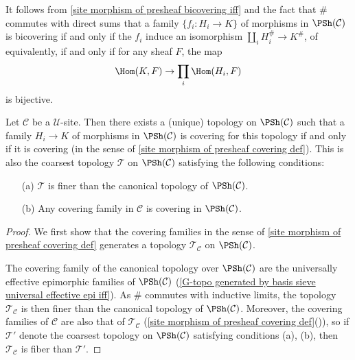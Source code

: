 \begin{remark}
It follows from \cref{site morphism of presheaf bicovering iff} and the fact that $\#$ commutes with direct sums that a family $\{f_i:H_i\to K\}$ of morphisms in $\PSh(\mathcal{C})$ is bicovering if and only if the $f_i$ induce an isomorphism $\coprod_iH_i^\#\to K^\#$, of equivalently, if and only if for any sheaf $F$, the map
\[\Hom(K,F)\to \prod_i\Hom(H_i,F)\]
is bijective.
\end{remark}
\begin{proposition}\label{site induced topology on PSh char}
Let $\mathcal{C}$ be a $\mathscr{U}$-site. Then there exists a (unique) topology on $\PSh(\mathcal{C})$ such that a family $H_i\to K$ of morphisms in $\PSh(\mathcal{C})$ is covering for this topology if and only if it is covering (in the sense of \cref{site morphism of presheaf covering def}). This is also the coarsest topology $\mathcal{T}$ on $\PSh(\mathcal{C})$ satisfying the following conditions:
\begin{enumerate}
\item[(a)] $\mathcal{T}$ is finer than the canonical topology of $\PSh(\mathcal{C})$.
\item[(b)] Any covering family in $\mathcal{C}$ is covering in $\PSh(\mathcal{C})$.
\end{enumerate}
\end{proposition}
\begin{proof}
We first show that the covering families in the sense of \cref{site morphism of presheaf covering def} generates a topology $\mathcal{T}_\mathcal{C}$ on $\PSh(\mathcal{C})$.\par 
The covering family of the canonical topology over $\PSh(\mathcal{C})$ are the universally effective epimorphic families of $\PSh(\mathcal{C})$ (\cref{G-topo generated by basis sieve universal effective epi iff}). As $\#$ commutes with inductive limits, the topology $\mathcal{T}_\mathcal{C}$ is then finer than the canonical topology of $\PSh(\mathcal{C})$. Moreover, the covering families of $\mathcal{C}$ are also that of $\mathcal{T}_\mathcal{C}$ (\cref{site morphism of presheaf covering def}()), so if $\mathcal{T}'$ denote the coarsest topology on $\PSh(\mathcal{C})$ satisfying conditions (a), (b), then $\mathcal{T}_\mathcal{C}$ is fiber than $\mathcal{T}'$. 
\end{proof}
